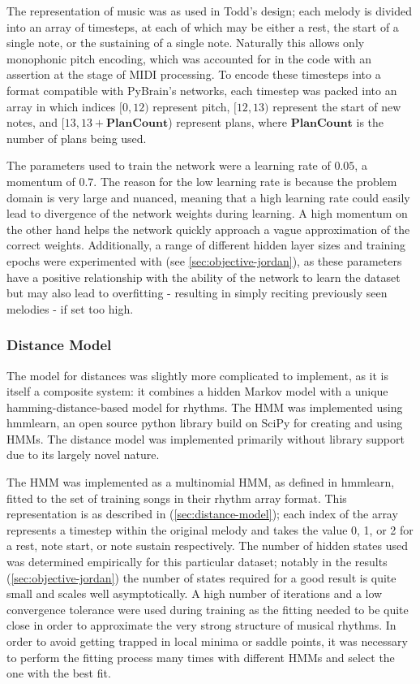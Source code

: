 \documentclass[ author={Stephen Livermore-Tozer},
				supervisor={Dr. Peter Flach},
				degree={MEng},
				title={Algorithmic Co-composition Using Machine Learning},
				subtitle={},
				type={research},
				year={2016} ]{dissertation}
\begin{document}
	The representation of music was as used in Todd's design; each melody is divided into an array of timesteps, at each of which may be either a rest, the start of a single note, or the sustaining of a single note. Naturally this allows only monophonic pitch encoding, which was accounted for in the code with an assertion at the stage of MIDI processing. To encode these timesteps into a format compatible with PyBrain's networks, each timestep was packed into an array in which indices $[0,12)$ represent pitch, $[12,13)$ represent the start of new notes, and $[13,13+\mathbf{PlanCount}$) represent plans, where $\mathbf{PlanCount}$ is the number of plans being used.
	
	The parameters used to train the network were a learning rate of $0.05$, a momentum of $0.7$. The reason for the low learning rate is because the problem domain is very large and nuanced, meaning that a high learning rate could easily lead to divergence of the network weights during learning. A high momentum on the other hand helps the network quickly approach a vague approximation of the correct weights. Additionally, a range of different hidden layer sizes and training epochs were experimented with (see \ref{sec:objective-jordan}), as these parameters have a positive relationship with the ability of the network to learn the dataset but may also lead to overfitting - resulting in simply reciting previously seen melodies - if set too high.
	
	\subsubsection{Distance Model}
	
	The model for distances was slightly more complicated to implement, as it is itself a composite system: it combines a hidden Markov model with a unique hamming-distance-based model for rhythms. The HMM was implemented using hmmlearn, an open source python library build on SciPy for creating and using HMMs. The distance model was implemented primarily without library support due to its largely novel nature. 
	
	The HMM was implemented as a multinomial HMM, as defined in hmmlearn, fitted to the set of training songs in their rhythm array format. This representation is as described in (\ref{sec:distance-model}); each index of the array represents a timestep within the original melody and takes the value 0, 1, or 2 for a rest, note start, or note sustain respectively. The number of hidden states used was determined empirically for this particular dataset; notably in the results (\ref{sec:objective-jordan}) the number of states required for a good result is quite small and scales well asymptotically. A high number of iterations and a low convergence tolerance were used during training as the fitting needed to be quite close in order to approximate the very strong structure of musical rhythms. In order to avoid getting trapped in local minima or saddle points, it was necessary to perform the fitting process many times with different HMMs and select the one with the best fit.
	
\end{document}
